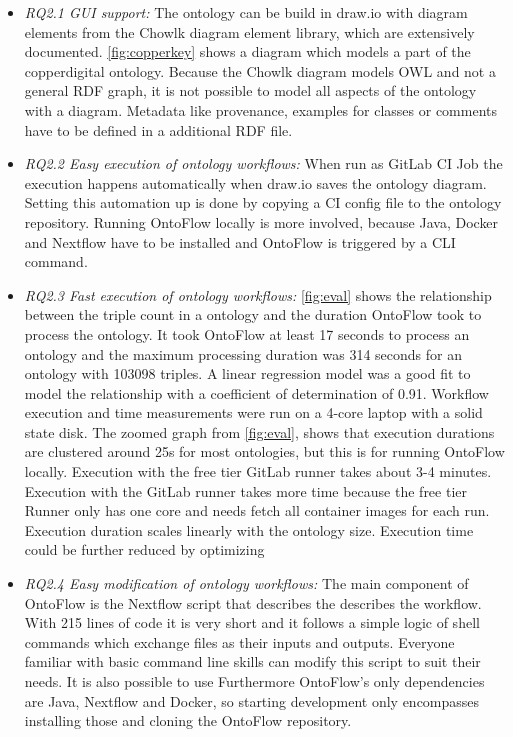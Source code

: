 \documentclass[sigconf]{acmart}
\begin{document}
\begin{itemize}[leftmargin=*]
\item \textit{RQ2.1 GUI support:} The ontology can be build in draw.io with diagram elements from the Chowlk diagram element library, which are extensively documented. \ref{fig:copperkey} shows a diagram which models a part of the copperdigital ontology. Because the Chowlk diagram models OWL and not a general RDF graph, it is not possible to model all aspects of the ontology with a diagram. Metadata like provenance, examples for classes or comments have to be defined in a additional RDF file.
\item \textit{RQ2.2 Easy execution of ontology workflows:} When run as GitLab CI Job the execution happens automatically when draw.io saves the ontology diagram. Setting this automation up is done by copying a CI config file to the ontology repository. Running OntoFlow locally is more involved, because Java, Docker and Nextflow have to be installed and OntoFlow is triggered by a CLI command.
\item \textit{RQ2.3 Fast execution of ontology workflows:} \ref{fig:eval} shows the relationship between the triple count in a ontology and the duration OntoFlow took to process the ontology.
It took OntoFlow at least 17 seconds to process an ontology and the maximum processing duration was 314 seconds for an ontology with 103098 triples.
A linear regression model was a good fit to model the relationship with a coefficient of determination of 0.91.
Workflow execution and time measurements were run on a 4-core laptop with a solid state disk. 
The zoomed graph from \ref{fig:eval}, shows that execution durations are clustered around 25s for most ontologies, but this is for running OntoFlow locally. Execution with the free tier GitLab runner takes about 3-4 minutes. Execution with the GitLab runner takes more time because the free tier Runner only has one core and needs fetch all container images for each run.
Execution duration scales linearly with the ontology size. 
Execution time could be further reduced by optimizing 

\item \textit{RQ2.4 Easy modification of ontology workflows:} The main component of OntoFlow is the Nextflow script that describes the describes the workflow. With 215 lines of code it is very short and it follows a simple logic of shell commands which exchange files as their inputs and outputs. Everyone familiar with basic command line skills can modify this script to suit their needs. It is also possible to use  Furthermore OntoFlow's only dependencies are Java, Nextflow and Docker, so starting development only encompasses installing those and cloning the OntoFlow repository.
\end{itemize}
\end{document}

